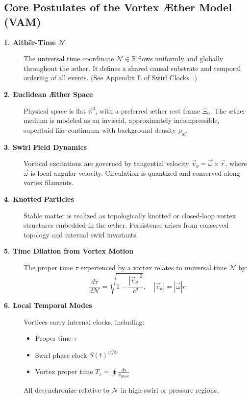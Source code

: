     \subsection{Core Postulates of the Vortex Æther Model (VAM)}

    \begin{description}
        \item[\textbf{1. Aithēr-Time \(\mathcal{N}\)}]%
        The universal time coordinate \( \mathcal{N} \in \mathbb{R} \) flows uniformly and globally throughout the æther. It defines a shared
        causal substrate and temporal ordering of all events. (See Appendix E of Swirl Clocks~\cite{iskandarani2025vam2}.)

        \item[\textbf{2. Euclidean Æther Space}]%
        Physical space is flat \( \mathbb{R}^3 \), with a preferred æther rest frame \( \Xi_0 \). The æther medium is modeled as an inviscid, approximately incompressible, superfluid-like continuum with background density \( \rho_{\text{\ae}} \).

        \item[\textbf{3. Swirl Field Dynamics}]%
        Vortical excitations are governed by tangential velocity \( \vec{v}_\theta = \vec{\omega} \times \vec{r} \), where \( \vec{\omega} \) is local angular velocity. Circulation is quantized and conserved along vortex filaments.

        \item[\textbf{4. Knotted Particles}]%
        Stable matter is realized as topologically knotted or closed-loop vortex structures embedded in the æther. Persistence arises from conserved topology and internal swirl invariants.

        \item[\textbf{5. Time Dilation from Vortex Motion}]%
        The proper time \( \tau \) experienced by a vortex relates to universal time \( \mathcal{N} \) by:
        \begin{equation}
            \boxed{
                \frac{d\tau}{d\mathcal{N}} = \sqrt{1 - \frac{|\vec{v}_\theta|^2}{c^2}}, \quad |\vec{v}_\theta| = |\vec{\omega}| r
            }
            \label{eq:tau-dilation}
        \end{equation}


        \item[\textbf{6. Local Temporal Modes}]%
        Vortices carry internal clocks, including:
        \begin{itemize}
            \item Proper time \( \tau \)
            \item Swirl phase clock \( S(t)^{\circlearrowleft\!/\!\circlearrowright} \)
            \item Vortex proper time \( T_v = \oint \frac{ds}{v_\text{phase}} \)
        \end{itemize}
        All desynchronize relative to \( \mathcal{N} \) in high-swirl or pressure regions.


\end{description}
